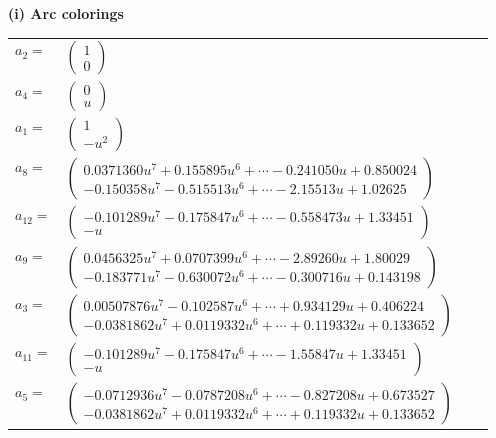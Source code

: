 \documentclass[1p]{elsarticle_modified}
\theoremstyle{definition}
\begin{document}
\flushleft \textbf{(i) Arc colorings}\\
\begin{tabular}{m{7pt} m{180pt} m{7pt} m{180pt} }
\flushright $a_{2}=$&$\begin{pmatrix}1\\0\end{pmatrix}$ \\
\flushright $a_{4}=$&$\begin{pmatrix}0\\u\end{pmatrix}$ \\
\flushright $a_{1}=$&$\begin{pmatrix}1\\- u^2\end{pmatrix}$ \\
\flushright $a_{8}=$&$\begin{pmatrix}0.0371360 u^{7}+0.155895 u^{6}+\cdots-0.241050 u+0.850024\\-0.150358 u^{7}-0.515513 u^{6}+\cdots-2.15513 u+1.02625\end{pmatrix}$ \\
\flushright $a_{12}=$&$\begin{pmatrix}-0.101289 u^{7}-0.175847 u^{6}+\cdots-0.558473 u+1.33451\\- u\end{pmatrix}$ \\
\flushright $a_{9}=$&$\begin{pmatrix}0.0456325 u^{7}+0.0707399 u^{6}+\cdots-2.89260 u+1.80029\\-0.183771 u^{7}-0.630072 u^{6}+\cdots-0.300716 u+0.143198\end{pmatrix}$ \\
\flushright $a_{3}=$&$\begin{pmatrix}0.00507876 u^{7}-0.102587 u^{6}+\cdots+0.934129 u+0.406224\\-0.0381862 u^{7}+0.0119332 u^{6}+\cdots+0.119332 u+0.133652\end{pmatrix}$ \\
\flushright $a_{11}=$&$\begin{pmatrix}-0.101289 u^{7}-0.175847 u^{6}+\cdots-1.55847 u+1.33451\\- u\end{pmatrix}$ \\
\flushright $a_{5}=$&$\begin{pmatrix}-0.0712936 u^{7}-0.0787208 u^{6}+\cdots-0.827208 u+0.673527\\-0.0381862 u^{7}+0.0119332 u^{6}+\cdots+0.119332 u+0.133652\end{pmatrix}$ \\

\end{tabular}
\end{document}
